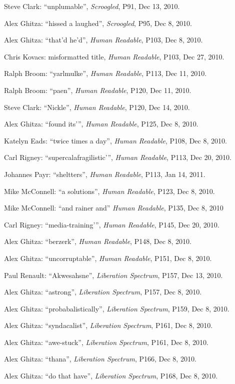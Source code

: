 \begin{flushleft}
Steve Clark: “unplumable”, \emph{Scroogled}, P91, Dec 13, 2010.

Alex Ghitza: “hissed a laughed”, \emph{Scroogled}, P95, Dec 8, 2010.

Alex Ghitza: “that'd he'd”, \emph{Human Readable}, P103, Dec 8, 
2010.

Chris Kovacs: misformatted title, \emph{Human Readable}, P103, Dec 27, 
2010.

Ralph Broom: “yarlmulke”, \emph{Human Readable}, P113, Dec 11, 2010.

Ralph Broom: “paen”, \emph{Human Readable}, P120, Dec 11, 2010.

Steve Clark: “Nickle”, \emph{Human Readable}, P120, Dec 14, 2010.

Alex Ghitza: “found its'”, \emph{Human Readable}, P125, Dec 8, 2010.

Katelyn Eads: “twice times a day”, \emph{Human Readable}, P108, Dec 
8, 2010.

Carl Rigney: “supercalafragilistic'”, \emph{Human Readable}, P113, 
Dec 20, 2010.

Johannes Payr: “sheltters”, \emph{Human Readable}, P113, Jan 14, 
2011.

Mike McConnell: “a solutions”, \emph{Human Readable}, P123, Dec 8, 
2010.

Mike McConnell: “and rainer and” \emph{Human Readable}, P135, Dec 
8, 2010

Carl Rigney: “media-training'”, \emph{Human Readable}, P145, Dec 
20, 2010.

Alex Ghitza: “berzerk”, \emph{Human Readable}, P148, Dec 8, 2010.

Alex Ghitza: “uncorruptable”, \emph{Human Readable}, P151, Dec 8, 
2010.

Paul Renault: “Akwesahsne”, \emph{Liberation Spectrum}, P157, Dec 
13, 2010.

Alex Ghitza: “astrong”, \emph{Liberation Spectrum}, P157, Dec 8, 
2010.

Alex Ghitza: “probabalistically”, \emph{Liberation Spectrum}, P159, 
Dec 8, 2010.

Alex Ghitza: “syndacalist”, \emph{Liberation Spectrum}, P161, Dec 
8, 2010.

Alex Ghitza: “awe-stuck”, \emph{Liberation Spectrum}, P161, Dec 8, 
2010.

Alex Ghitza: “thana”, \emph{Liberation Spectrum}, P166, Dec 8, 2010.

Alex Ghitza: “do that have”, \emph{Liberation Spectrum}, P168, Dec 
8, 2010.


\end{flushleft}
